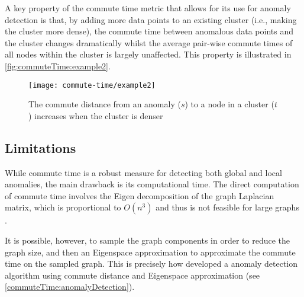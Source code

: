 A key property of the commute time metric that allows for its use for anomaly
detection is that, by adding more data points to an existing cluster (i.e.,
making the cluster more dense), the commute time between anomalous data points
and the cluster changes dramatically whilst the average pair-wise commute times
of all nodes within the cluster is largely unaffected. This property is
illustrated in \autoref{fig:commuteTime:example2}.

\begin{figure}
    \centering
    \texttt{[image: commute-time/example2]}
    \caption[The commute distance from an anomaly to a node in a cluster
        increases when the cluster is denser]{The commute distance from an
        anomaly ($s$) to a node in a cluster ($t$) increases when the cluster is
        denser \cite{Khoa:2012}}
    \label{fig:commuteTime:example2}
\end{figure}

\subsection{Limitations}
\label{commuteTime:limitations}
While commute time is a robust measure for detecting both global and local
anomalies, the main drawback is its computational time. The direct computation
of commute time involves the Eigen decomposition of the graph Laplacian matrix,
which is proportional to $O(n^3)$ and thus is not feasible for large graphs
\cite{Khoa:2012}.

It is possible, however, to sample the graph components in order to reduce the
graph size, and then an Eigenspace approximation to approximate the commute time
on the sampled graph. This is precisely how \citeauthor{Khoa:2012} developed a
anomaly detection algorithm using commute distance and Eigenspace approximation
(see \autoref{commuteTime:anomalyDetection}).

